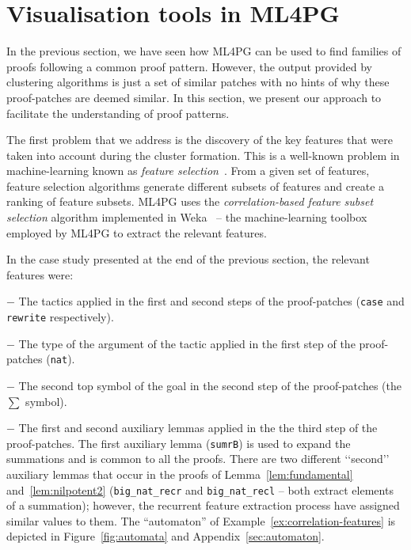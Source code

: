 \section{Visualisation tools in ML4PG}\label{sec:visualisation}


In the previous section, we have seen how ML4PG can be used to find families of proofs following 
a common proof pattern. However, the output provided by clustering algorithms is just a set
of similar patches with no hints of why these proof-patches are deemed similar. 
In this section, we present our approach to facilitate the understanding of proof patterns.


The first problem that we address is the discovery of the key features that were taken
into account during the cluster formation. This is a well-known problem in machine-learning 
known as \emph{feature selection}~\cite{Weka}. From a given set of features, feature selection algorithms 
generate different subsets of features and create a ranking of feature subsets.
ML4PG uses the \emph{correlation-based feature subset selection} algorithm implemented in Weka~\cite{Weka}
-- the machine-learning toolbox employed by ML4PG to extract the relevant features.

\begin{example}\label{ex:correlation-features}
In the case study presented at the end of the previous section, the relevant features were:

$-$ The tactics applied in the first and second steps of the proof-patches (\lstinline?case? and \lstinline?rewrite? respectively).

$-$ The type of the argument of the tactic applied in the first step of the proof-patches (\lstinline?nat?).

$-$ The second top symbol of the goal in the second step of the proof-patches (the $\sum$ symbol). 

$-$ The first and second auxiliary lemmas applied in the the third step of the proof-patches. The first auxiliary lemma (\lstinline?sumrB?) is used to expand the summations and is 
common to all the proofs. There are two different \lq\lq{}second\rq\rq{} auxiliary lemmas that occur in the proofs of Lemma~\ref{lem:fundamental} and~\ref{lem:nilpotent2} (\lstinline?big_nat_recr? and
\lstinline?big_nat_recl? -- both extract elements of a summation); however, the recurrent feature extraction process have assigned similar values to them.
The ``automaton'' of Example~\ref{ex:correlation-features} is depicted in Figure~\ref{fig:automata} and Appendix~\ref{sec:automaton}.
\end{example}

